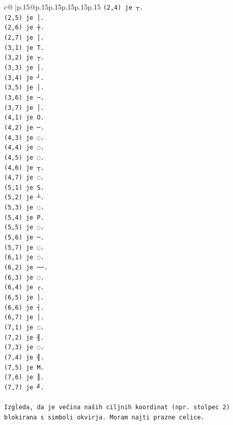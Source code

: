 \documentclass{article}
\begin{document}
{\begin{supertabular}{c@{$\;$}|p{.15\linewidth}@{}p{.15\linewidth}p{.15\linewidth}p{.15\linewidth}p{.15\linewidth}p{.15\linewidth}}
{{{\texttt{(2,4) je ┬.} \\
\texttt{(2,5) je │.} \\
\texttt{(2,6) je ┼.} \\
\texttt{(2,7) je │.} \\
\texttt{(3,1) je T.} \\
\texttt{(3,2) je ┬.} \\
\texttt{(3,3) je │.} \\
\texttt{(3,4) je ┘.} \\
\texttt{(3,5) je │.} \\
\texttt{(3,6) je ─.} \\
\texttt{(3,7) je │.} \\
\texttt{(4,1) je O.} \\
\texttt{(4,2) je ─.} \\
\texttt{(4,3) je ◌.} \\
\texttt{(4,4) je ◌.} \\
\texttt{(4,5) je ◌.} \\
\texttt{(4,6) je ┬.} \\
\texttt{(4,7) je ◌.} \\
\texttt{(5,1) je S.} \\
\texttt{(5,2) je ┴.} \\
\texttt{(5,3) je ◌.} \\
\texttt{(5,4) je P.} \\
\texttt{(5,5) je ◌.} \\
\texttt{(5,6) je ─.} \\
\texttt{(5,7) je ◌.} \\
\texttt{(6,1) je ◌.} \\
\texttt{(6,2) je ──.} \\
\texttt{(6,3) je ◌.} \\
\texttt{(6,4) je ┌.} \\
\texttt{(6,5) je │.} \\
\texttt{(6,6) je ┤.} \\
\texttt{(6,7) je │.} \\
\texttt{(7,1) je ◌.} \\
\texttt{(7,2) je ╢.} \\
\texttt{(7,3) je ◌.} \\
\texttt{(7,4) je ╢.} \\
\texttt{(7,5) je M.} \\
\texttt{(7,6) je ║.} \\
\texttt{(7,7) je ╝.} \\
\\ 
\texttt{Izgleda, da je večina naših ciljnih koordinat (npr. stolpec 2) blokirana s simboli okvirja. Moram najti prazne celice.} \\
}}}
\end{supertabular}}
\end{document}
